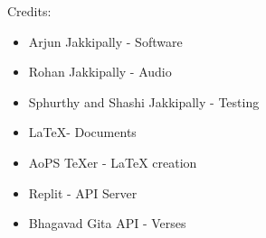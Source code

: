 \documentclass[12pt, letterpaper]{article}
\begin{document}
Credits:
\begin{itemize}
  \item Arjun Jakkipally - Software
  \item Rohan Jakkipally - Audio
  \item Sphurthy and Shashi Jakkipally - Testing
  \item \LaTeX - Documents
  \item AoPS \TeX er - \LaTeX{} creation
  \item Replit - API Server
  \item Bhagavad Gita API - Verses
\end{itemize}
\end{document}
